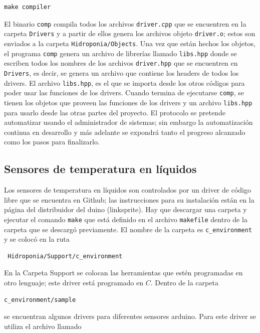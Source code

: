 \documentclass[a4paper,10pt,titlepage]{article}
\begin{document}
\begin{verbatim}
make compiler
\end{verbatim}

El binario \verb|comp| compila 
todos los archivos \verb|driver.cpp| que se encuentren en la carpeta \verb|Drivers| y a partir de ellos genera los archivos objeto \verb|driver.o|; estos 
son enviados a la carpeta \verb|Hidroponia/Objects|. Una vez que est\'an hechos los 
objetos, el programa \verb|comp| genera un archivo de librer\'ias 
llamado \verb|libs.hpp| 
donde se escriben todos los nombres de los archivos \verb|driver.hpp| que se encuentren en \verb|Drivers|, es decir, se genera un archivo que contiene los headers de todos 
los drivers. El archivo 
\verb|libs.hpp|, es el 
que se importa desde los otros c\'odigos para poder usar las funciones de los drivers. Cuando termina de ejecutarse \verb|comp|, se tienen los objetos que proveen las 
funciones de los drivers y un 
archivo \verb|libs.hpp| para usarlo desde las otras partes del proyecto. El protocolo se pretende automatizar usando el administrador de sistemas; sin embargo la 
automatizaci\'on continua en 
desarrollo y m\'as adelante se expondr\'a tanto el progreso alcanzado como los pasos para finalizarlo.

\subsection{Sensores de temperatura en l\'iquidos}
Los sensores de temperatura en l\'iquidos son controlados por un driver de 
c\'odigo libre que se encuentra en Github; las instrucciones para su 
instalaci\'on est\'an en la p\'agina del 
distribuidor del duino (linksprite). Hay que descargar una carpeta y 
ejecutar el comando \verb|make| que est\'a definido en el archivo \verb|makefile| dentro de la 
carpeta que se descarg\'o previamente. El nombre de la carpeta es \verb|c_environment| y se coloc\'o en la ruta

\begin{verbatim}
 Hidroponia/Support/c_environment
\end{verbatim}

En la Carpeta Support se colocan las herramientas que est\'en programadas en otro lenguaje; este driver est\'a programado en  
$C$. Dentro de la carpeta 

\begin{verbatim}
c_environment/sample
\end{verbatim}

se encuentran algunos drivers para 
diferentes sensores arduino. Para este driver se utiliza el 
archivo llamado
\end{document}
